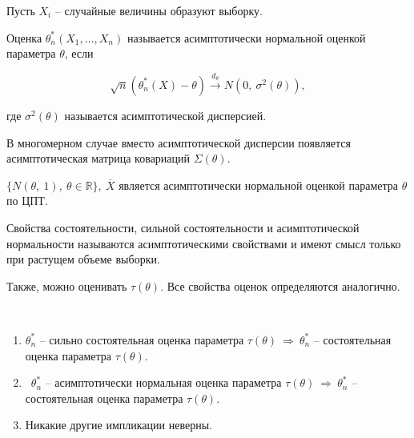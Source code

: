 Пусть $\displaystyle X_{i}$ -- случайные величины образуют выборку.
\begin{definition}
Оценка $\displaystyle \theta _{n}^{*}( X_{1} ,\dotsc ,X_{n})$ называется асимптотически нормальной оценкой параметра $\displaystyle \theta $, если

\begin{equation*}
\sqrt{n}\left( \theta _{n}^{*}( X) -\theta \right)\xrightarrow{d_{\theta }} N\left( 0,\ \sigma ^{2}( \theta )\right),
\end{equation*}

где $\displaystyle \sigma ^{2}( \theta )$ называется асимптотической дисперсией.
\end{definition}
\begin{note}
В многомерном случае вместо асимптотической дисперсии появляется асимптотическая матрица ковариаций $\displaystyle \Sigma ( \theta )$.
\end{note}
\begin{example}
$\displaystyle \{N( \theta,\ 1),\ \theta \in \mathbb{R}\},\ \overline{X}$ является асимптотически нормальной оценкой параметра $\displaystyle \theta $ по ЦПТ.
\end{example}
\begin{note}
Свойства состоятельности, сильной состоятельности и асимптотической нормальности называются асимптотическими свойствами и имеют смысл только при растущем объеме выборки.
\end{note}
\begin{note}
Также, можно оценивать $\displaystyle \tau ( \theta )$. Все свойства оценок определяются аналогично.
\end{note}
\begin{theorem} \
\begin{enumerate}
    \item $\displaystyle \theta _{n}^{*}$ -- сильно состоятельная оценка параметра $\displaystyle \tau ( \theta )$$\displaystyle\ \Rightarrow\ $$\displaystyle \theta _{n}^{*}$ -- состоятельная оценка параметра $\displaystyle \tau ( \theta )$.
    
    \item \ $\displaystyle \theta _{n}^{*}$ -- асимптотически нормальная оценка параметра $\displaystyle \tau ( \theta )$$\displaystyle\ \Rightarrow\ $$\displaystyle \theta _{n}^{*}$ -- состоятельная оценка параметра $\displaystyle \tau ( \theta )$.
    
    \item Никакие другие импликации неверны.
\end{enumerate}

\end{theorem}
